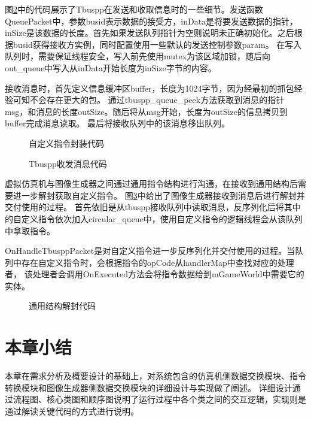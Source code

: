 \par
图\ref{tbusio}中的代码展示了Tbuspp在发送和收取信息时的一些细节。发送函数QueuePacket中，参数busid表示数据的接受方，inData是将要发送数据的指针，
inSize是该数据的长度。首先如果发送队列指针为空则说明未正确初始化。之后根据busid获得接收方实例，同时配置使用一些默认的发送控制参数param。
在写入队列时，需要保证线程安全，写入前先使用mutex为该区域加锁，随后向out\_queue中写入从inData开始长度为inSize字节的内容。
\par
接收消息时，首先定义信息缓冲区buffer，长度为1024字节，因为经最初的抓包经验可知不会存在更大的包。
通过tbuspp\_queue\_peek方法获取到消息的指针msg，和消息的长度outSize。随后将从msg开始，长度为outSize的信息拷贝到buffer完成消息读取。
最后将接收队列中的该消息移出队列。
\begin{figure}[h!]
    \begin{center}
        
        \caption{自定义指令封装代码}
        \label{IGsend}
    \end{center}
\end{figure}
\begin{figure}[h!]
    \begin{center}
        
        \caption{Tbuspp收发消息代码}
        \label{tbusio}
    \end{center}
\end{figure}
\par
虚拟仿真机与图像生成器之间通过通用指令结构进行沟通，在接收到通用结构后需要进一步解封获取自定义指令。
图\ref{IGrecv}中给出了图像生成器接收到消息后进行解封并交付使用的过程。
首先依旧是从tbuspp接收队列中读取消息，反序列化后将其中的自定义指令依次加入circular\_queue中，使用自定义指令的逻辑线程会从该队列中拿取指令。
\par
OnHandleTbusppPacket是对自定义指令进一步反序列化并交付使用的过程。当队列中存在自定义指令时，会根据指令的opCode从handlerMap中查找对应的处理者，
该处理者会调用OnExecuted方法会将指令数据给到mGameWorld中需要它的实体。
\begin{figure}[h!]
    \begin{center}
        
        \caption{通用结构解封代码}
        \label{IGrecv}
    \end{center}
\end{figure}


\section{本章小结}
本章在需求分析及概要设计的基础上，对系统包含的仿真机侧数据交换模块、指令转换模块和图像生成器侧数据交换模块的详细设计与实现做了阐述。
详细设计通过流程图、核心类图和顺序图说明了运行过程中各个类之间的交互逻辑，实现则是通过解读关键代码的方式进行说明。
